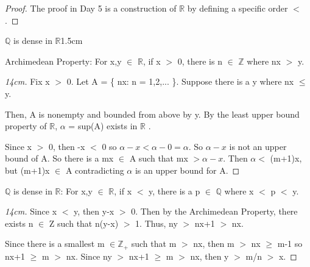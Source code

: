 	\begin{proof}
		The proof in Day 5 is a construction of $\mathbb{R}$ by defining a
		specific order $<$.
	\end{proof}

	\vspace{0.4cm}



	\begin{ltheorem}{$\mathbb{Q}$  is dense in $\mathbb{R}$}{1.5cm}
		\item {\color{lblue} Archimedean Property}:
			For x,y $\in$ $\mathbb{R}$, if x $>$ 0, there is n $\in$ $ \mathbb{Z} $
			where nx $>$ y.
	
			\begin{proof}[14cm]
				Fix x $>$ 0. Let A = \{ nx: n = 1,2,... \}.
				Suppose there is a y where nx $\leq$ y.

				Then, A is nonempty and bounded from above by y.
				By the least upper bound property of $ \mathbb{R} $,
				$\alpha$ = sup(A) exists in $ \mathbb{R} $ .

				Since x $>$ 0, then -x $<$ 0 so $\alpha - x < \alpha-0 = \alpha$.
				So $\alpha-x$ is not an upper bound of A.
				So there is a mx $\in$ A such that mx $> \alpha-x$.
				Then $\alpha <$ (m+1)x, but (m+1)x $\in$ A
				contradicting $\alpha$ is an upper bound for A.
			\end{proof}

		\item {\color{lblue} $ \mathbb{Q} $  is dense in $ \mathbb{R} $}:
			For x,y $\in$ $\mathbb{R}$, if x $<$ y,
			there is a p $\in$ $ \mathbb{Q} $ where x $<$ p $<$ y.

			\begin{proof}[14cm]
				Since x $<$ y, then y-x $>$ 0. Then by the Archimedean Property,
				there exists n $\in$ Z such that n(y-x) $>$ 1.
				Thus, ny $>$ nx+1 $>$ nx.

				Since there is a smallest m $\in \mathbb{Z_+} $ such that m $>$ nx,
				then m $>$ nx $\geq$ m-1 so nx+1 $\geq$ m $>$ nx.
				Since ny $>$ nx+1 $\geq$ m $>$ nx, then y $>$ m/n $>$ x.
			\end{proof}
	\end{ltheorem}